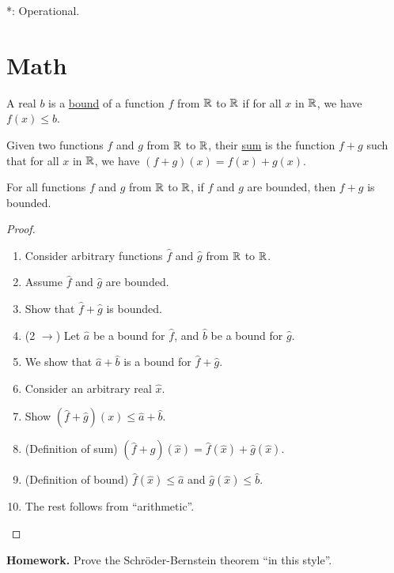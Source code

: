 {{*: Operational.

\section{Math}
\begin{definition}
  A real $b$ is a \underline{bound} of a 
  function $f$ from $\mathbb{R}$ to $\mathbb{R}$ if for all $x$ in 
  $\mathbb{R}$, we have $f(x) \leq b$. 
\end{definition}

\begin{definition}
  Given two functions $f$ and $g$ from $\mathbb{R}$ to 
  $\mathbb{R}$, their \underline{sum} is the function $f + g$ such 
  that for all $x$ in $\mathbb{R}$, we have $(f+g) (x) = f(x) + g(x)$.
\end{definition} 

\begin{theorem}
  For all functions $f$ and $g$ from $\mathbb{R}$ to $\mathbb{R}$, if $f$ and
  $g$ are bounded, then $f+g$ is bounded. 
\end{theorem}
\begin{proof}
  \begin{enumerate}
    \item Consider arbitrary functions $\hat{f}$ and $\hat{g}$ from 
    $\mathbb{R}$ to $\mathbb{R}$.
    \item Assume $\hat{f}$ and $\hat{g}$ are bounded. 
    \item Show that $\hat{f} + \hat{g}$ is bounded.
    \item (2 $\rightarrow$) Let $\hat{a}$ be a bound for $\hat{f}$, 
    and $\hat{b}$ be a bound for $\hat{g}$.
    \item We show that $\hat{a} + \hat{b}$ is a bound for 
    $\hat{f} + \hat{g}$.
    \item Consider an arbitrary real $\hat{x}$.
    \item Show $(\hat{f}+\hat{g})(x) \leq \hat{a} + \hat{b}$.
    \item (Definition of sum) $(\hat{f}+\hat{g})(\hat{x}) 
    = \hat{f}(\hat{x}) + \hat{g}(\hat{x})$.
    \item (Definition of bound) $\hat{f}(\hat{x}) \leq \hat{a}$ and 
    $\hat{g}(\hat{x}) \leq \hat{b}$.
    \item The rest follows from ``arithmetic''. 
  \end{enumerate}
\end{proof}

\noindent \textbf{Homework.} Prove the Schr\"{o}der-Bernstein theorem 
``in this style''.

}}
